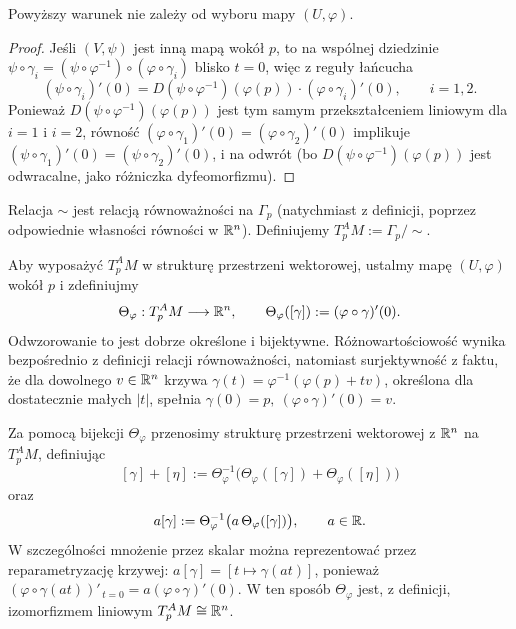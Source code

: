 \begin{fakt}
Powyższy warunek nie zależy od wyboru mapy $(U,\varphi)$.
\end{fakt}
\begin{proof}
Jeśli $(V,\psi)$ jest inną mapą wokół $p$, to na wspólnej dziedzinie $\psi\circ\gamma_i=
(\psi\circ\varphi^{-1})\circ(\varphi\circ\gamma_i)$ blisko $t=0$, więc z reguły łańcucha
\[
(\psi\circ\gamma_i)'(0)=D(\psi\circ\varphi^{-1})(\varphi(p))\cdot(\varphi\circ\gamma_i)'(0),
\qquad i=1,2.
\]
Ponieważ $D(\psi\circ\varphi^{-1})(\varphi(p))$ jest tym samym przekształceniem liniowym
dla $i=1$ i $i=2$, równość $(\varphi\circ\gamma_1)'(0)=(\varphi\circ\gamma_2)'(0)$
implikuje $(\psi\circ\gamma_1)'(0)=(\psi\circ\gamma_2)'(0)$, i na odwrót (bo
$D(\psi\circ\varphi^{-1})(\varphi(p))$ jest odwracalne, jako różniczka dyfeomorfizmu).
\end{proof}

Relacja $\sim$ jest relacją równoważności na $\Gamma_p$ (natychmiast z definicji, poprzez
odpowiednie własności równości w $\mathbb{R}^n$). Definiujemy $T_p^AM:=\Gamma_p/\!\sim$.

Aby wyposażyć $T_p^AM$ w strukturę przestrzeni wektorowej, ustalmy mapę
$(U,\varphi)$ wokół $p$ i zdefiniujmy
\[
\Theta_\varphi:T_p^AM\longrightarrow\mathbb{R}^n,
\qquad
\Theta_\varphi([\gamma]):=(\varphi\circ\gamma)'(0).
\]
Odwzorowanie to jest dobrze określone i bijektywne. Różnowartościowość
wynika bezpośrednio z definicji relacji równoważności, natomiast
surjektywność z faktu, że dla dowolnego $v\in\mathbb{R}^n$ krzywa $\gamma(t)=\varphi^{-1}(\varphi(p)+tv)$,
określona dla dostatecznie małych $|t|$, spełnia $\gamma(0)=p, \ (\varphi\circ\gamma)'(0)=v$.

Za pomocą bijekcji $\Theta_\varphi$ przenosimy strukturę przestrzeni
wektorowej z $\mathbb{R}^n$ na $T_p^AM$, definiując
\[
[\gamma]+[\eta]
:=
\Theta_\varphi^{-1}
\bigl(\Theta_\varphi([\gamma])+\Theta_\varphi([\eta])\bigr)
\]
oraz
\[
a[\gamma]
:=
\Theta_\varphi^{-1}
\bigl(a\,\Theta_\varphi([\gamma])\bigr),
\qquad a\in\mathbb{R}.
\]
W szczególności mnożenie przez skalar można reprezentować przez
reparametryzację krzywej: $a[\gamma]=[t\mapsto\gamma(at)]$,
ponieważ $(\varphi\circ\gamma(at))'_{\,t=0} = a(\varphi\circ\gamma)'(0)$.
W ten sposób $\Theta_\varphi$ jest, z definicji, izomorfizmem liniowym
$T_p^AM\cong\mathbb{R}^n$.

